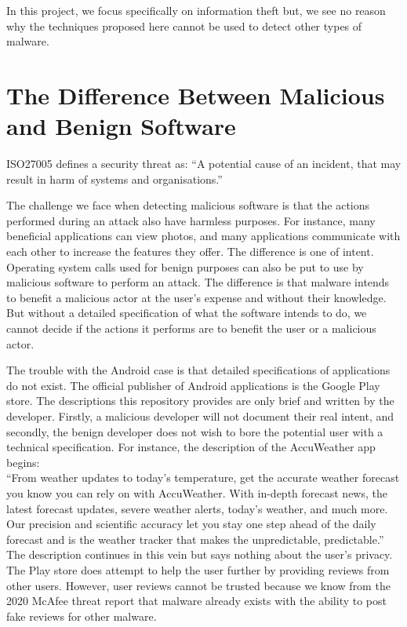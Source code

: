 In this project, we focus specifically on information theft but, we see no reason why the techniques proposed here cannot be used to detect other types of malware.

\section{The Difference Between Malicious and Benign Software}

ISO27005 defines a security threat as: ``A potential cause of an incident, that may result in harm of systems and organisations.''

The challenge we face when detecting malicious software is that the actions performed during an attack also have harmless purposes.  For instance, many beneficial applications can view photos, and many applications communicate with each other to increase the features they offer.  The difference is one of intent.  Operating system calls used for benign purposes can also be put to use by malicious software to perform an attack.  The difference is that malware intends to benefit a malicious actor at the user's expense and without their knowledge.  But without a detailed specification of what the software intends to do, we cannot decide if the actions it performs are to benefit the user or a malicious actor.

The trouble with the Android case is that detailed specifications of applications do not exist. The official publisher of Android applications is the Google Play store.  The descriptions this repository provides are only brief and written by the developer.  Firstly, a malicious developer will not document their real intent, and secondly, the benign developer does not wish to bore the potential user with a technical specification.  For instance, the description of the AccuWeather app begins:\\

``From weather updates to today's temperature, get the accurate weather forecast you know you can rely on with AccuWeather. With in-depth forecast news, the latest forecast updates, severe weather alerts, today's weather, and much more. Our precision and scientific accuracy let you stay one step ahead of the daily forecast and is the weather tracker that makes the unpredictable, predictable.''\\

The description continues in this vein but says nothing about the user's privacy. The Play store does attempt to help the user further by providing reviews from other users. However, user reviews cannot be trusted because we know from the 2020 McAfee threat report \cite{McAfeeMobileThreatReport} that malware already exists with the ability to post fake reviews for other malware.

